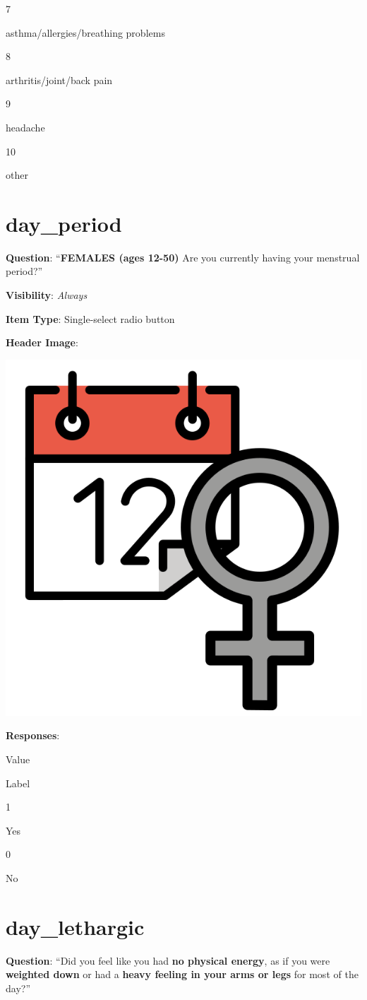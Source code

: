 \documentclass[]{book}
\begin{document}
7

asthma/allergies/breathing problems

8

arthritis/joint/back pain

9

headache

10

other

\hypertarget{day_period}{%
\section{day\_period}\label{day_period}}

\textbf{Question}: ``\textbf{FEMALES (ages 12-50)} Are you currently having your menstrual period?''

\textbf{Visibility}: \emph{Always}

\textbf{Item Type}: Single-select radio button

\textbf{Header Image}:

\begin{flushleft}\includegraphics[width=0.33\linewidth]{downloadFigs4latex_NIMH_Applet_Codebook/day_period_headerImg} \end{flushleft}

\textbf{Responses}:

Value

Label

1

Yes

0

No

\hypertarget{day_lethargic}{%
\section{day\_lethargic}\label{day_lethargic}}

\textbf{Question}: ``Did you feel like you had \textbf{no physical energy}, as if you were \textbf{weighted down} or had a \textbf{heavy feeling in your arms or legs} for most of the day?''
\end{document}

